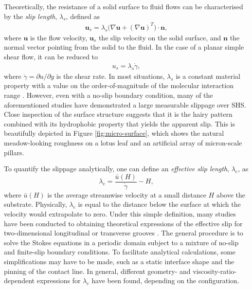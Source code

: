 Theoretically, the resistance of a solid surface to fluid flows can be characterised by the \emph{slip length}, $\lambda_s$, defined as
\begin{equation}
 \begin{aligned}
  \bm{u}_s = \lambda_s \bigg( \nabla {\bm u} + (\nabla {\bm u})^T \bigg) \cdot \bm{n},
 \end{aligned}
\end{equation}
where $\bm{u}$ is the flow velocity, $\bm{u}_s$ the slip velocity on the solid surface, and $\bm n$ the normal vector pointing from the solid to the fluid.
In the case of a planar simple shear flow, it can be reduced to
\begin{equation}
 \begin{aligned}
  u_s = \lambda_s \dot{\gamma},
 \end{aligned}
\end{equation}
where $\dot{\gamma}=\partial u/\partial y$ is the shear rate.
In most situations, $\lambda_s$ is a constant material property with a value on the order-of-magnitude of the molecular interaction range \citep{Thompson_Troian_1997}.
However, even with a no-slip boundary condition, many of the aforementioned studies have demonstrated a large measurable slippage over SHS.
Close inspection of the surface structure suggests that it is the hairy pattern combined with its hydrophobic property that yields the apparent slip.
This is beautifully depicted in Figure \ref{fig:micro-surface}, which shows the natural meadow-looking roughness on a lotus leaf and an artificial array of micron-scale pillars. 

To quantify the slippage analytically, one can define an \emph{effective slip length}, $\lambda_e$, as
\begin{equation} \label{eff slip}
  \lambda_e = \frac{\bar{u}(H)}{\dot{\gamma}}-H,
\end{equation}
where $\bar{u}(H)$ is the average streamwise velocity at a small distance $H$ above the substrate.
Physically, $\lambda_e$ is equal to the distance below the surface at which the velocity would extrapolate to zero.
Under this simple definition, many studies have been conducted to obtaining theoretical expressions of the effective slip for two-dimensional longitudinal or transverse grooves \citep{Lauga_Stone, Sbragalia_Prosperetti, Davis_Lauga, Ng_Wang, Schonecker, Nizkaya, Crowdy_tran, Crowdy_long}.
The general procedure is to solve the Stokes equations in a periodic domain subject to a mixture of no-slip and finite-slip boundary conditions. To facilitate analytical calculations, some simplifications may have to be made, such as a static interface shape and the pinning of the contact line.
In general, different geometry- and viscosity-ratio-dependent expressions for $\lambda_e$ have been found, depending on the configuration.


